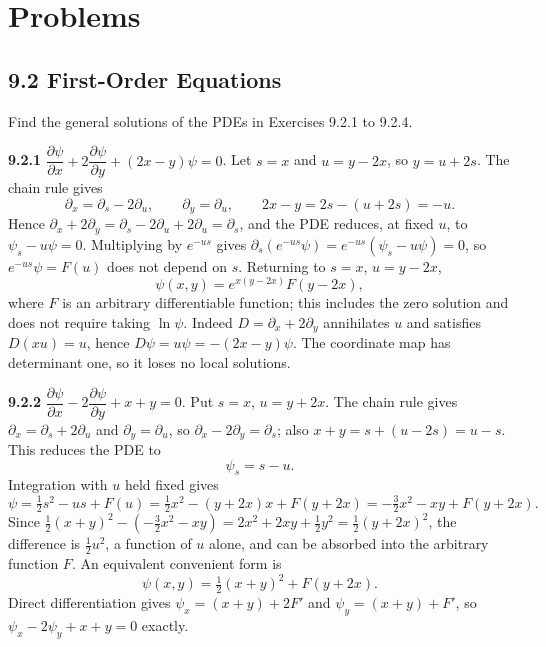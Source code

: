 
\section*{Problems}

\subsection*{9.2 First-Order Equations}

Find the general solutions of the PDEs in Exercises 9.2.1 to 9.2.4.

\par\bigskip
\noindent\textbf{9.2.1}\quad
$\dfrac{\partial\psi}{\partial x}+2\dfrac{\partial\psi}{\partial y}+(2x-y)\psi=0$.
\solution
Let $s=x$ and $u=y-2x$, so $y=u+2s$.  The chain rule gives
\[
\partial_x=\partial_s-2\partial_u,\qquad
\partial_y=\partial_u,\qquad 2x-y=2s-(u+2s)=-u.
\]
Hence $\partial_x+2\partial_y=\partial_s-2\partial_u+2\partial_u=\partial_s$,
and the PDE reduces, at fixed $u$, to
$\psi_s-u\psi=0$.  Multiplying by $e^{-us}$ gives
$\partial_s(e^{-us}\psi)=e^{-us}(\psi_s-u\psi)=0$, so
$e^{-us}\psi=F(u)$ does not depend on $s$.  Returning to $s=x$,
$u=y-2x$,
\[
\boxed{\psi(x,y)=e^{x(y-2x)}F(y-2x)},
\]
where $F$ is an arbitrary differentiable function; this includes the zero
solution and does not require taking $\ln\psi$.
Indeed $D=\partial_x+2\partial_y$ annihilates $u$ and satisfies
$D(xu)=u$, hence $D\psi=u\psi=-(2x-y)\psi$.
The coordinate map has determinant one, so it loses no local solutions.


\par\bigskip
\noindent\textbf{9.2.2}\quad
$\dfrac{\partial\psi}{\partial x}-2\dfrac{\partial\psi}{\partial y}+x+y=0$.
\solution
Put $s=x$, $u=y+2x$.  The chain rule gives
$\partial_x=\partial_s+2\partial_u$ and $\partial_y=\partial_u$, so
$\partial_x-2\partial_y=\partial_s$; also $x+y=s+(u-2s)=u-s$.
This reduces the PDE to
\[
\psi_s=s-u.
\]
Integration with $u$ held fixed gives
\[
\psi=\tfrac12s^2-us+F(u)
=\tfrac12x^2-(y+2x)x+F(y+2x)
=-\tfrac32x^2-xy+F(y+2x).
\]
Since
$\tfrac12(x+y)^2-(-\tfrac32x^2-xy)=2x^2+2xy+\tfrac12y^2
=\tfrac12(y+2x)^2$,
the difference is $\tfrac12u^2$, a function of $u$ alone, and can be
absorbed into the arbitrary function $F$.  An equivalent convenient
form is
\[
\boxed{\psi(x,y)=\tfrac12(x+y)^2+F(y+2x)}.
\]
Direct differentiation gives
$\psi_x=(x+y)+2F'$ and $\psi_y=(x+y)+F'$, so
$\psi_x-2\psi_y+x+y=0$ exactly.


